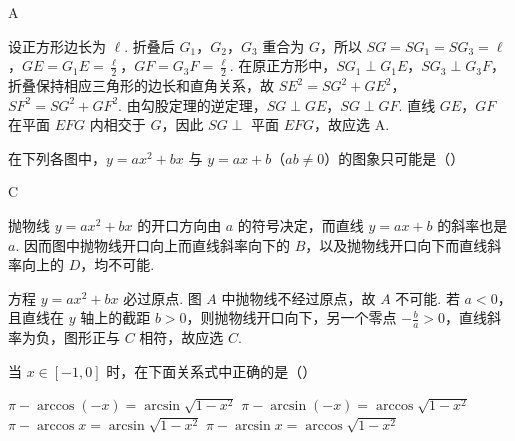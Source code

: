 \begin{answer}
A
\end{answer}

\begin{solution}
设正方形边长为 \(\ell\). 折叠后 \(G_1\)，\(G_2\)，\(G_3\) 重合为 \(G\)，所以 \(SG=SG_1=SG_3=\ell\)，\(GE=G_1E=\frac{\ell}{2}\)，\(GF=G_3F=\frac{\ell}{2}\). 在原正方形中，\(SG_1\perp G_1E\)，\(SG_3\perp G_3F\)，折叠保持相应三角形的边长和直角关系，故
\(SE^2=SG^2+GE^2\)，\(SF^2=SG^2+GF^2\).
由勾股定理的逆定理，\(SG\perp GE\)，\(SG\perp GF\). 直线 \(GE\)，\(GF\) 在平面 \(EFG\) 内相交于 \(G\)，因此 \(SG\perp\) 平面 \(EFG\)，故应选 A.
\end{solution}

\begin{problem}

在下列各图中，\(y = ax^2 + bx\) 与 \(y = ax + b\)（\(ab \neq 0\)）的图象只可能是（\quad）

    {}
    {}
    {}
\end{problem}

\begin{answer}
C
\end{answer}

\begin{solution}
抛物线 \(y=ax^2+bx\) 的开口方向由 \(a\) 的符号决定，而直线 \(y=ax+b\) 的斜率也是 \(a\). 因而图中抛物线开口向上而直线斜率向下的 \(B\)，以及抛物线开口向下而直线斜率向上的 \(D\)，均不可能.

方程 \(y=ax^2+bx\) 必过原点. 图 \(A\) 中抛物线不经过原点，故 \(A\) 不可能. 若 \(a<0\)，且直线在 \(y\) 轴上的截距 \(b>0\)，则抛物线开口向下，另一个零点 \(-\frac{b}{a}>0\)，直线斜率为负，图形正与 \(C\) 相符，故应选 \(C\).
\end{solution}

\begin{problem}

当 \(x \in [-1,0]\) 时，在下面关系式中正确的是（\quad）

\choices
    {\(\pi - \arccos (-x) = \arcsin \sqrt{1 - x^2}\)}
    {\(\pi - \arcsin (-x) = \arccos \sqrt{1 - x^2}\)}
    {\(\pi - \arccos x = \arcsin \sqrt{1 - x^2}\)}
    {\(\pi - \arcsin x = \arccos \sqrt{1 - x^2}\)}
\end{problem}

